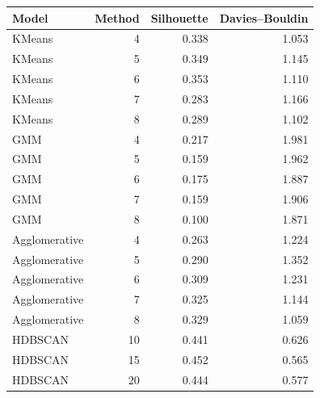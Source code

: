 \begin{tabular}{lrrr}
\toprule
Model & Method & Silhouette & Davies--Bouldin \\
\midrule
KMeans & 4 & 0.338 & 1.053 \\
KMeans & 5 & 0.349 & 1.145 \\
KMeans & 6 & 0.353 & 1.110 \\
KMeans & 7 & 0.283 & 1.166 \\
KMeans & 8 & 0.289 & 1.102 \\
GMM & 4 & 0.217 & 1.981 \\
GMM & 5 & 0.159 & 1.962 \\
GMM & 6 & 0.175 & 1.887 \\
GMM & 7 & 0.159 & 1.906 \\
GMM & 8 & 0.100 & 1.871 \\
Agglomerative & 4 & 0.263 & 1.224 \\
Agglomerative & 5 & 0.290 & 1.352 \\
Agglomerative & 6 & 0.309 & 1.231 \\
Agglomerative & 7 & 0.325 & 1.144 \\
Agglomerative & 8 & 0.329 & 1.059 \\
HDBSCAN & 10 & 0.441 & 0.626 \\
HDBSCAN & 15 & 0.452 & 0.565 \\
HDBSCAN & 20 & 0.444 & 0.577 \\
\bottomrule
\end{tabular}
